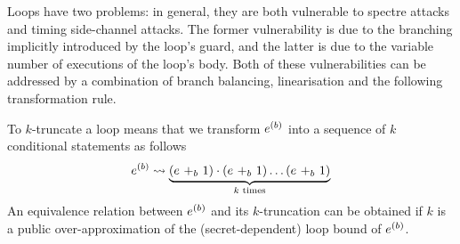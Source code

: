 Loops have two problems: in general, they are both vulnerable to spectre attacks and timing side-channel attacks. The former vulnerability is due to the branching implicitly introduced by the loop's guard, and the latter is due to the variable number of executions of the loop's body. Both of these vulnerabilities can be addressed by a combination of branch balancing, linearisation and the following transformation rule.
\begin{definition}[$k$-Truncation]
To $k$-truncate a loop means that we transform $\iterate{b}{e}$ into a sequence of $k$ conditional statements as follows
\begin{align*}
\iterate{b}{e} \leadsto \underbrace{\left(\branch{b}{e}{1}\right)\cdot\left(\branch{b}{e}{1}\right)\ldots\left(\branch{b}{e}{1}\right)}_\text{$k$ times}
\end{align*}
An equivalence relation between $\iterate{b}{e}$ and its $k$-truncation can be obtained if $k$ is a public over-approximation of the (secret-dependent) loop bound of $\iterate{b}{e}$.
\end{definition}

